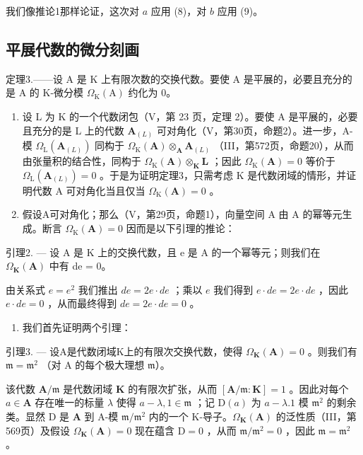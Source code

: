 我们像推论1那样论证，这次对 \(a\) 应用 (8)，对 \(b\) 应用 (9)。

\subsection{平展代数的微分刻画}

定理3.——设 A 是 K 上有限次数的交换代数。要使 A 是平展的，必要且充分的是 A 的 K-微分模 \(\Omega_{\mathrm{K}}(\mathrm{A})\) 约化为 0。

\begin{enumerate}
\def\labelenumi{\Alph{enumi})}
\item
  设 L 为 K 的一个代数闭包（V，第 23 页，定理 2）。要使 A 是平展的，必要且充分的是 L 上的代数 \(\mathbf{A}_{(L)}\) 可对角化（V，第30页，命题2）。进一步，A-模 \(\Omega_{\mathrm{L}}(\mathbf{A}_{(L)})\) 同构于 \(\Omega_{\mathrm{K}}(\mathbf{A}) \otimes_{\mathbf{A}} \mathbf{A}_{(L)}\) （III，第572页，命题20），从而由张量积的结合性，同构于 \(\Omega_{\mathrm{K}}(\mathbf{A}) \otimes_{\mathbf{K}} \mathbf{L}\) ；因此 \(\Omega_{\mathrm{K}}(\mathbf{A}) = 0\) 等价于 \(\Omega_{\mathrm{L}}(\mathbf{A}_{(L)}) = 0\) 。于是为证明定理3，只需考虑 K 是代数闭域的情形，并证明代数 A 可对角化当且仅当 \(\Omega_{\mathrm{K}}(\mathbf{A}) = 0\) 。
\item
  假设A可对角化；那么（V，第29页，命题1），向量空间 A 由 A 的幂等元生成。断言 \(\Omega_{\mathrm{K}}(\mathbf{A}) = 0\) 因而是以下引理的推论：
\end{enumerate}

引理2. --- 设 A 是 K 上的交换代数，且 e 是 A 的一个幂等元；则我们在 \(\Omega_{\mathbf{K}}(\mathbf{A})\) 中有 de = 0。

由关系式 \(e = e^2\) 我们推出 \(de = 2e \cdot de\) ；乘以 \(e\) 我们得到 \(e \cdot de = 2e \cdot de\) ，因此 \(e \cdot de = 0\) ，从而最终得到 \(de = 2e \cdot de = 0\) 。

\begin{enumerate}
\def\labelenumi{\Alph{enumi})}
\setcounter{enumi}{2}
\tightlist
\item
  我们首先证明两个引理：
\end{enumerate}

引理3. --- 设A是代数闭域K上的有限次交换代数，使得 \(\Omega_{\mathbf{K}}(\mathbf{A}) = 0\) 。则我们有 \(\mathfrak{m} = \mathfrak{m}^2\) （对 A 的每个极大理想 \(\mathfrak{m}\)）。

该代数 \(\mathbf{A} / \mathfrak{m}\) 是代数闭域 \(\mathbf{K}\) 的有限次扩张，从而 \([\mathbf{A} / \mathfrak{m}:\mathbf{K}] = 1\) 。因此对每个 \(a\in \mathbf{A}\) 存在唯一的标量 \(\lambda\) 使得 \(a - \lambda ,1\in \mathfrak{m}\) ；记 \(\mathrm{D}(a)\) 为 \(a - \lambda .1\) 模 \(\mathfrak{m}^2\) 的剩余类。显然 \(\mathrm{D}\) 是 \(\mathbf{A}\) 到 A-模 \(\mathfrak{m} / \mathfrak{m}^2\) 内的一个 K-导子。\(\Omega_{\mathbf{K}}(\mathbf{A})\) 的泛性质（III，第569页）及假设 \(\Omega_{\mathbf{K}}(\mathbf{A}) = 0\) 现在蕴含 \(\mathrm{D} = 0\) ，从而 \(\mathfrak{m} / \mathfrak{m}^2 = 0\) ，因此 \(\mathfrak{m} = \mathfrak{m}^2\) 。

